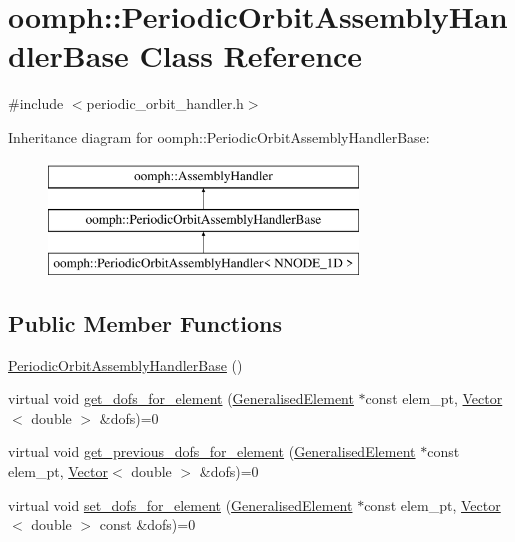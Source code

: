 \hypertarget{classoomph_1_1PeriodicOrbitAssemblyHandlerBase}{}\section{oomph\+:\+:Periodic\+Orbit\+Assembly\+Handler\+Base Class Reference}
\label{classoomph_1_1PeriodicOrbitAssemblyHandlerBase}


{\ttfamily \#include $<$periodic\+\_\+orbit\+\_\+handler.\+h$>$}

Inheritance diagram for oomph\+:\+:Periodic\+Orbit\+Assembly\+Handler\+Base\+:\begin{figure}[H]
\begin{center}
\leavevmode
\includegraphics[height=3.000000cm]{classoomph_1_1PeriodicOrbitAssemblyHandlerBase}
\end{center}
\end{figure}
\subsection*{Public Member Functions}
\begin{DoxyCompactItemize}
\item 
\hyperlink{classoomph_1_1PeriodicOrbitAssemblyHandlerBase_a75182b5fa555a6d410015feb180701b8}{Periodic\+Orbit\+Assembly\+Handler\+Base} ()
\item 
virtual void \hyperlink{classoomph_1_1PeriodicOrbitAssemblyHandlerBase_a48968325ba57e969f64298c5b2dfb8f8}{get\+\_\+dofs\+\_\+for\+\_\+element} (\hyperlink{classoomph_1_1GeneralisedElement}{Generalised\+Element} $\ast$const elem\+\_\+pt, \hyperlink{classoomph_1_1Vector}{Vector}$<$ double $>$ \&dofs)=0
\item 
virtual void \hyperlink{classoomph_1_1PeriodicOrbitAssemblyHandlerBase_a680c82526671e8213d317367f3f7a7e1}{get\+\_\+previous\+\_\+dofs\+\_\+for\+\_\+element} (\hyperlink{classoomph_1_1GeneralisedElement}{Generalised\+Element} $\ast$const elem\+\_\+pt, \hyperlink{classoomph_1_1Vector}{Vector}$<$ double $>$ \&dofs)=0
\item 
virtual void \hyperlink{classoomph_1_1PeriodicOrbitAssemblyHandlerBase_a09d7c31dec8b9688cec82f8b24558b9b}{set\+\_\+dofs\+\_\+for\+\_\+element} (\hyperlink{classoomph_1_1GeneralisedElement}{Generalised\+Element} $\ast$const elem\+\_\+pt, \hyperlink{classoomph_1_1Vector}{Vector}$<$ double $>$ const \&dofs)=0
\end{DoxyCompactItemize}


